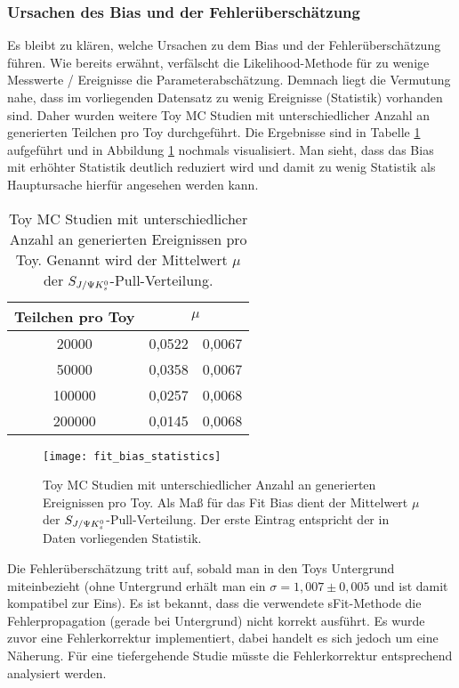 \subsubsection{Ursachen des Bias und der Fehlerüberschätzung}
Es bleibt zu klären, welche Ursachen zu dem Bias und der Fehlerüberschätzung führen. Wie bereits erwähnt, verfälscht die Likelihood-Methode für zu wenige Messwerte / Ereignisse die Parameterabschätzung. Demnach liegt die Vermutung nahe, dass im vorliegenden Datensatz zu wenig Ereignisse (\glqq Statistik\grqq) vorhanden sind. Daher wurden weitere Toy MC Studien mit unterschiedlicher Anzahl an generierten Teilchen pro Toy durchgeführt. Die Ergebnisse sind in Tabelle \ref{tab:fit_bias_events} aufgeführt und in Abbildung \ref{fig:fit_bias_events} nochmals visualisiert. Man sieht, dass das Bias mit erhöhter Statistik deutlich reduziert wird und damit zu wenig Statistik als Hauptursache hierfür angesehen werden kann.
\begin{table}[hptb]
\centering
\caption{Toy MC Studien mit unterschiedlicher Anzahl an generierten Ereignissen pro Toy. Genannt wird der Mittelwert $\mu$ der $S_{J/\Psi K_s^0}$-Pull-Verteilung.}
\label{tab:fit_bias_events}
\begin{tabular}{cr@{$\pm$}l}
\hline \hline 
Teilchen pro Toy & \multicolumn{2}{c}{$\mu$}  \\ \hline
20000            &  0,0522 & 0,0067 \\
50000            &  0,0358 & 0,0067 \\
100000           &  0,0257 & 0,0068 \\
200000           &  0,0145 & 0,0068 \\ 
\hline \hline
\end{tabular}
\end{table}
\begin{figure}[hptb]
\centering
\texttt{[image: fit\_bias\_statistics]}
\caption{Toy MC Studien mit unterschiedlicher Anzahl an generierten Ereignissen pro Toy. Als Maß für das Fit Bias dient der Mittelwert $\mu$ der $S_{J/\Psi K_s^0}$-Pull-Verteilung. Der erste Eintrag entspricht der in Daten vorliegenden Statistik.}
\label{fig:fit_bias_events}
\end{figure}

Die Fehlerüberschätzung tritt auf, sobald man in den Toys Untergrund miteinbezieht (ohne Untergrund erhält man ein $\sigma=1,007\pm 0,005$ und ist damit kompatibel zur Eins). Es ist bekannt, dass die verwendete sFit-Methode die Fehlerpropagation (gerade bei Untergrund) nicht korrekt ausführt. Es wurde zuvor eine Fehlerkorrektur implementiert, dabei handelt es sich jedoch um eine Näherung. Für eine tiefergehende Studie müsste die Fehlerkorrektur entsprechend analysiert werden.

